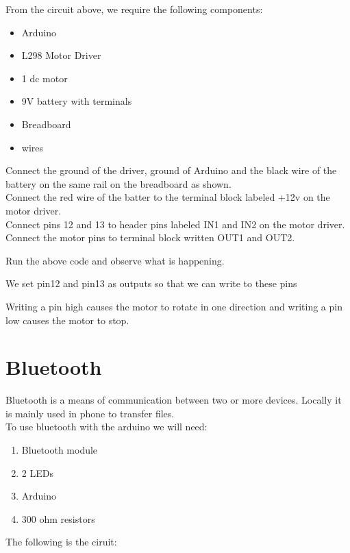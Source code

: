 \documentclass[14pt, oneside]{memoir}
\begin{document}
From the circuit above, we require the following components:
\begin{itemize}
    \item Arduino
    \item L298 Motor Driver
    \item 1 dc motor
    \item 9V battery with terminals
    \item Breadboard
    \item wires
\end{itemize}
Connect the ground of the driver, ground of Arduino and the black wire
of the battery on the same rail on the breadboard as shown.
\\
Connect the red wire of the batter to the terminal block labeled +12v on
the motor driver.
\\
Connect pins 12 and 13 to header pins labeled IN1 and IN2 on the motor
driver.
\\
Connect the motor pins to terminal block written OUT1 and OUT2.




Run the above code and observe what is happening.

We set pin12 and pin13 as outputs so that we can write to these pins

Writing a pin high causes the motor to rotate in one direction and
writing a pin low causes the motor to stop.

\section*{Bluetooth}

Bluetooth is a means of communication between two or more devices.
Locally it is mainly used in phone to transfer files.
\\

To use bluetooth with the arduino we will need:
\begin{enumerate}
        \def\labelenumi{\arabic{enumi}.}
    \item
        Bluetooth module
    \item
        2 LEDs
    \item
        Arduino
    \item
        300 ohm resistors
\end{enumerate}

The following is the ciruit:
\end{document}
